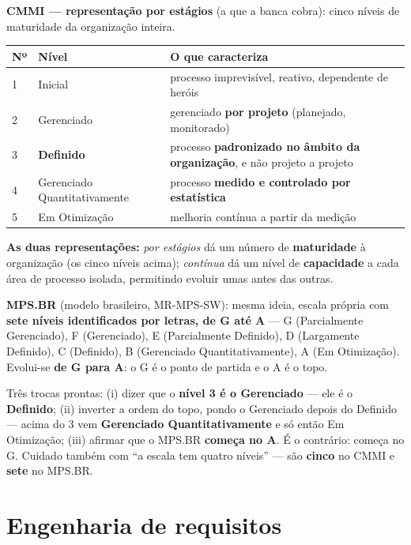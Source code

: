 \textbf{CMMI --- representação por estágios} (a que a banca cobra): cinco
níveis de maturidade da organização inteira.

\begin{center}
\begin{tabular}{@{}p{1cm}p{3.6cm}p{7.2cm}@{}}
\toprule
\textbf{Nº} & \textbf{Nível} & \textbf{O que caracteriza} \\
\midrule
1 & Inicial & processo imprevisível, reativo, dependente de heróis \\
2 & Gerenciado & gerenciado \textbf{por projeto} (planejado, monitorado) \\
3 & \textbf{Definido} & processo \textbf{padronizado no âmbito da organização}, e não projeto a projeto \\
4 & Gerenciado Quantitativamente & processo \textbf{medido e controlado por estatística} \\
5 & Em Otimização & melhoria contínua a partir da medição \\
\bottomrule
\end{tabular}
\end{center}

\textbf{As duas representações:} \emph{por estágios} dá um número de
\textbf{maturidade} à organização (os cinco níveis acima); \emph{contínua} dá
um nível de \textbf{capacidade} a cada área de processo isolada, permitindo
evoluir umas antes das outras.

\textbf{MPS.BR} (modelo brasileiro, MR-MPS-SW): mesma ideia, escala própria
com \textbf{sete níveis identificados por letras, de G até A} --- G
(Parcialmente Gerenciado), F (Gerenciado), E (Parcialmente Definido), D
(Largamente Definido), C (Definido), B (Gerenciado Quantitativamente), A (Em
Otimização). Evolui-se \textbf{de G para A}: o G é o ponto de partida e o A é
o topo.

\begin{pegadinha}
Três trocas prontas: (i) dizer que o \textbf{nível 3 é o Gerenciado} --- ele é
o \textbf{Definido}; (ii) inverter a ordem do topo, pondo o Gerenciado depois
do Definido --- acima do 3 vem \textbf{Gerenciado Quantitativamente} e só
então Em Otimização; (iii) afirmar que o MPS.BR \textbf{começa no A}. É o
contrário: começa no G. Cuidado também com ``a escala tem quatro níveis'' ---
são \textbf{cinco} no CMMI e \textbf{sete} no MPS.BR.
\end{pegadinha}

\section{Engenharia de requisitos}

